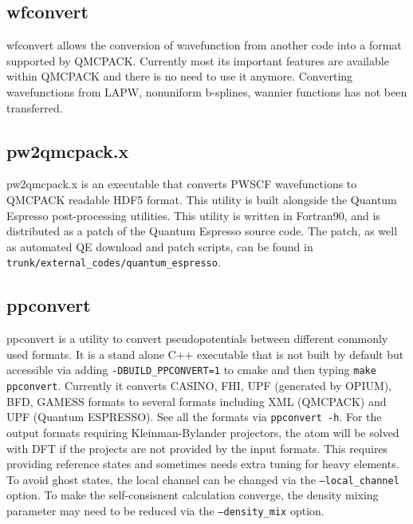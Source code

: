   \subsection{wfconvert}
    wfconvert allows the conversion of wavefunction from another code into a format supported by QMCPACK.
    Currently most its important features are available within QMCPACK and there is no need to use it anymore.
    Converting wavefunctions from LAPW, nonuniform b-splines, wannier functions has not been transferred.
  \subsection{pw2qmcpack.x}
    pw2qmcpack.x is an executable that converts PWSCF wavefunctions to QMCPACK readable 
    HDF5 format.  This utility is built alongside the Quantum Espresso post-processing utilities.
    This utility is written in Fortran90, and is distributed as a patch of the Quantum Espresso 
    source code.  The patch, as well as automated QE download and patch scripts, can be found in 
    \texttt{trunk/external\_codes/quantum\_espresso}.
  \subsection{ppconvert}
    ppconvert is a utility to convert pseudopotentials between different commonly used formats.
    It is a stand alone C++ executable that is not built by default but accessible via adding
    \texttt{-DBUILD\_PPCONVERT=1} to cmake and then typing \texttt{make ppconvert}.
    Currently it converts CASINO, FHI, UPF (generated by OPIUM), BFD, GAMESS formats to several formats
    including XML (QMCPACK) and UPF (Quantum ESPRESSO). See all the formats via \texttt{ppconvert -h}.
    For the output formats requiring Kleinman-Bylander projectors, the atom will be solved with DFT
    if the projects are not provided by the input formats.
    This requires providing reference states and sometimes needs extra tuning for heavy elements.
    To avoid ghost states, the local channel can be changed via the \texttt{--local\_channel} option.
    To make the self-consisnent calculation converge, the density mixing parameter may need to be reduced
    via the \texttt{--density\_mix} option.

